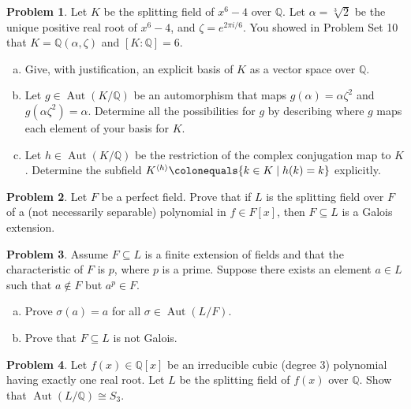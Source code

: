 \documentclass[11pt]{article}
\DeclareMathOperator{\Aut}{Aut}
\newcommand{\Q}{\mathbb{Q}}
\theoremstyle{definition}
\newtheorem{problem}{Problem}
\begin{document}
\begin{problem}
Let $K$ be the splitting field of $x^6-4$ over $\Q$. Let $\alpha = \sqrt[3]{2}$ be the unique positive real root of $x^6-4$, and $\zeta = e^{2\pi i/6}$. You showed in Problem Set 10 that $K=\Q(\alpha,\zeta)$ and $[K:\Q]=6$.

\begin{enumerate}[a)]
\item Give, with justification, an explicit basis of $K$ as a vector space over $\Q$. 

\item Let $g \in \Aut(K/\Q)$ be an automorphism that maps $g(\alpha)= \alpha\zeta^2$ and $g(\alpha\zeta^2)=\alpha$. Determine all the possibilities for $g$ by describing where $g$ maps each element of your basis for $K$. 

\item Let $h \in \Aut(K/\Q)$ be the restriction of the complex conjugation map to $K$. Determine the subfield $K^{\langle h \rangle} \colonequals \{k\in K \mid h(k)=k\}$ explicitly. 
\end{enumerate}
\end{problem}


\begin{problem}
Let $F$ be a perfect field. Prove that if $L$ is the splitting field over $F$ of a (not necessarily separable) polynomial in $f \in F[x]$, then $F \subseteq L$ is a Galois extension.
\end{problem}




\begin{problem}
Assume $F \subseteq L$ is a finite extension of fields and that the characteristic of $F$ is $p$, where $p$ is a prime. Suppose there exists an element $a \in L$ such that $a \notin F$ but $a^p \in F$.
\begin{enumerate}[a)]
\item Prove $\sigma(a) = a$ for all $\sigma \in \Aut(L/F)$.
\item Prove that $F \subseteq L$ is not Galois.
\end{enumerate}
\end{problem}  



\begin{problem}
	Let $f(x) \in \Q[x]$ be an irreducible cubic (degree $3$) polynomial having exactly one real root. 
Let $L$ be the splitting field of $f(x)$ over $\Q$. Show that $\Aut(L/\Q) \cong S_3$.
\end{problem}
\end{document}
